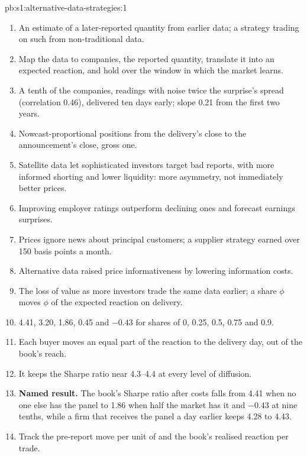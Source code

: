 \begin{solution}{pb:s1:alternative-data-strategies:1}
\begin{enumerate}
\item An estimate of a later-reported quantity from earlier data; a strategy trading on such  from non-traditional data.
\item Map the data to companies,  the reported quantity, translate it into an expected reaction, and hold over the window in which the market learns.
\item A tenth of the companies, readings with noise twice the surprise's spread (correlation 0.46), delivered ten days early; slope 0.21 from the first two
years.
\item Nowcast-proportional positions from the delivery's close to the announcement's close, gross one.
\item Satellite data let sophisticated investors target bad reports, with more informed shorting and lower liquidity: more asymmetry, not immediately better
prices.
\item Improving employer ratings outperform declining ones and forecast earnings surprises.
\item Prices ignore news about principal customers; a supplier strategy earned over 150 basis points a month.
\item Alternative data raised price informativeness by lowering information costs.
\item The loss of value as more investors trade the same data earlier; a share $\phi$ moves $\phi$ of the expected reaction on delivery.
\item 4.41, 3.20, 1.86, 0.45 and $-0.43$ for shares of 0, 0.25, 0.5, 0.75 and 0.9.
\item Each buyer moves an equal part of the reaction to the delivery day, out of the book's reach.
\item It keeps the Sharpe ratio near 4.3--4.4 at every level of diffusion.
\item \textbf{Named result.} The  book's Sharpe ratio after costs falls from 4.41 when no one else has the panel to 1.86 when half the market has it and
$-0.43$ at nine tenths, while a firm that receives the panel a day earlier keeps 4.28 to 4.43.
\item Track the pre-report move per unit of  and the book's realised reaction per trade.

\end{enumerate}
\end{solution}
